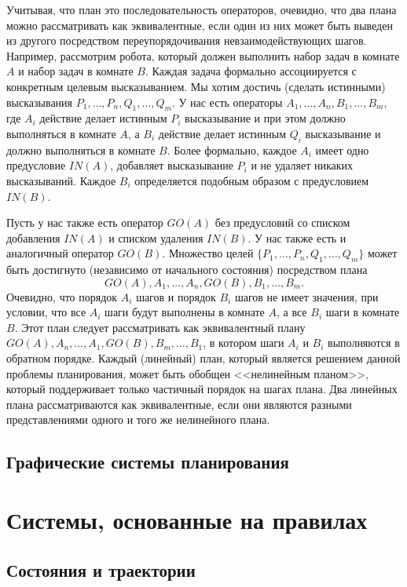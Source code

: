 \documentclass[b5paper,11pt]{book}
\begin{document}
		Учитывая, что план это последовательность операторов, очевидно, что два плана можно рассматривать как эквивалентные, если один из них может быть выведен из другого посредством	переупорядочивания невзаимодействующих шагов. Например, рассмотрим робота, который	должен выполнить набор задач в комнате $A$ и набор задач в комнате $B$. Каждая задача формально ассоциируется с конкретным целевым высказыванием. Мы хотим достичь (сделать истинными) высказывания $P_1, \dots, P_n, Q_1, \dots, Q_m$. У нас есть операторы $A_1, \dots, A_n, B_1, \dots, B_m$, где $A_i$ действие делает истинным $P_i$ высказывание и при этом должно выполняться в комнате $A$, а $B_i$ действие делает истинным $Q_i$ высказывание и должно выполняться в комнате $B$. Более
		формально, каждое $A_i$ имеет одно предусловие $IN(A)$, добавляет высказывание $P_i$ и не удаляет никаких высказываний. Каждое $B_i$ определяется подобным образом с предусловием $IN(B)$.
		
		Пусть у нас также есть оператор $GO(A)$ без предусловий со списком добавления $IN(A)$ и списком удаления $IN(B)$. У нас также есть и аналогичный оператор $GO(B)$. Множество целей	$\{P_1, \dots, P_n, Q_1, \dots, Q_m\}$ может быть достигнуто (независимо от начального состояния) посредством плана 
		\[
			GO(A), A_1, \dots, A_n, GO(B), B_1, \dots, B_m.
		\] 
		Очевидно, что порядок $A_i$ шагов и порядок $B_i$ шагов не имеет значения, при условии, что все $A_i$ шаги будут выполнены в комнате $A$, а все $B_i$ шаги в комнате $B$. Этот план следует рассматривать как эквивалентный плану $GO(A), A_n, \dots, A_1, GO(B), B_m, \dots, B_1$, в котором шаги $A_i$ и $B_i$ выполняются в обратном порядке. Каждый (линейный) план, который является решением данной проблемы планирования, может быть обобщен <<нелинейным планом>>, который поддерживает только частичный порядок на шагах	плана. Два линейных плана рассматриваются как эквивалентные, если они являются разными представлениями одного и того же нелинейного плана.
	
	\section{Графические системы планирования}
		
		
	
	\chapter{Системы, основанные на правилах}
	
	\section{Состояния и траектории}
\end{document}
